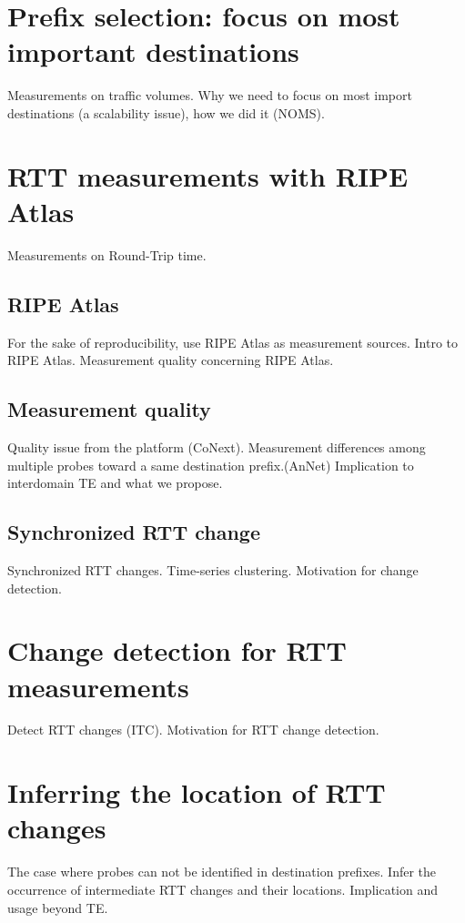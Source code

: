 \section{Prefix selection: focus on most important destinations}
Measurements on traffic volumes.
Why we need to focus on most import destinations (a scalability issue), how we did it (NOMS).

\section{RTT measurements with RIPE Atlas}
Measurements on Round-Trip time.
\subsection{RIPE Atlas}
For the sake of reproducibility, use RIPE Atlas as measurement sources.
Intro to RIPE Atlas.
Measurement quality concerning RIPE Atlas.
\subsection{Measurement quality}
Quality issue from the platform (CoNext).
Measurement differences among multiple probes toward a same destination prefix.(AnNet)
Implication to interdomain TE and what we propose.
\subsection{Synchronized RTT change}
Synchronized RTT changes. Time-series clustering.
Motivation for change detection.

\section{Change detection for RTT measurements}
Detect RTT changes (ITC).
Motivation for RTT change detection.

\section{Inferring the location of RTT changes}
The case where probes can not be identified in destination prefixes.
Infer the occurrence of intermediate RTT changes and their locations.
Implication and usage beyond TE.  
